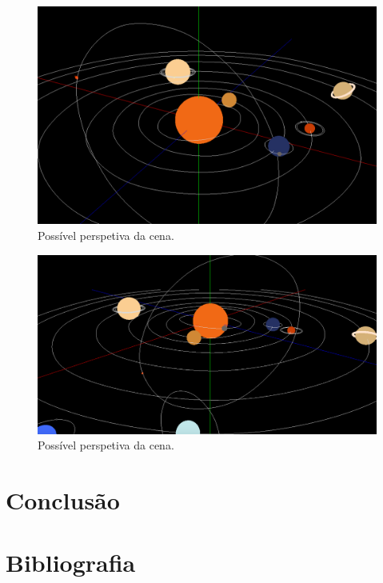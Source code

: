 \documentclass[a4paper]{article}
\begin{document}
\begin{figure}[H]
\centering
\includegraphics[scale=0.32]{scene_1.png}
\caption{Possível perspetiva da cena.}
\label{img:scene_1}
\end{figure}

\begin{figure}[H]
\centering
\includegraphics[scale=0.3]{scene_2.png}
\caption{Possível perspetiva da cena.}
\label{img:scene_2}
\end{figure}


\section{Conclusão}
\label{sec:conclusao}


\section{Bibliografia}
\label{sec:bibliografia}
\end{document}
